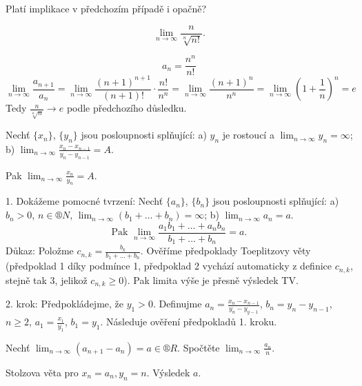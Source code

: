 \documentclass[12pt]{article}					%
\begin{document}
    \begin{priklad}
        Platí implikace v předchozím případě i opačně?
    \end{priklad}

    \begin{priklad}
        $$ \lim_{n \rightarrow ∞} \frac{n}{\sqrt[n]{n!}}. $$ 
        \begin{reseni}
            $$ a_n = \frac{n^n}{n!} $$ 
            $$ \lim_{n \rightarrow ∞} \frac{a_{n+1}}{a_n} = \lim_{n \rightarrow ∞} \frac{(n+1)^{n+1}}{(n+1)!} · \frac{n!}{n^n} = \lim_{n \rightarrow ∞} \frac{(n+1)^n}{n^n} = \lim_{n \rightarrow ∞}(1+\frac{1}{n})^n = e $$
            Tedy $\frac{n}{\sqrt[n]{n}} \rightarrow e$ podle předchozího důsledku.
        \end{reseni}
    \end{priklad}


    \begin{veta}[Stolzova]
        Nechť $\{x_n\}$, $\{y_n\}$ jsou posloupnosti splňující: a) $y_n$ je rostoucí a $\lim_{n \rightarrow ∞} y_n = ∞$; b) $\lim_{n \rightarrow ∞} \frac{x_n - x_{n-1}}{y_n - y_{n-1}} = A$.

        Pak $\lim_{n \rightarrow ∞} \frac{x_n}{y_n} = A$.

        \begin{dukazin}
            1. Dokážeme pomocné tvrzení: Nechť $\{a_n\}$, $\{b_n\}$ jsou posloupnosti splňující: a) $b_n > 0$, $n \in ®N$, $\lim_{n \rightarrow ∞} (b_1 + … + b_n) = ∞$; b) $\lim_{n \rightarrow ∞} a_n = a$.
            $$ \text{Pak } \lim_{n \rightarrow ∞} \frac{a_1b_1 + … + a_nb_n}{b_1 + … + b_n} = a. $$
            Důkaz: Položme $c_{n, k} = \frac{b_k}{b_1 + … + b_n}$. Ověříme předpoklady Toeplitzovy věty (předpoklad 1 díky podmínce 1, předpoklad 2 vychází automaticky z definice $c_{n, k}$, stejně tak 3, jelikož $c_{n,k} ≥ 0$). Pak limita výše je přesně výsledek TV.

            2. krok: Předpokládejme, že $y_1 > 0$. Definujme $a_n = \frac{x_n - x_{n-1}}{y_n - y_{y-1}}$, $b_n = y_n - y_{n-1}$, $n≥2$, $a_1 = \frac{x_1}{y_1}$, $b_1 = y_1$. Následuje ověření předpokladů 1. kroku.
        \end{dukazin}
    \end{veta}

    \begin{priklad}
        Nechť $\lim_{n \rightarrow ∞}(a_{n+1} - a_n) = a \in ®R$. Spočtěte $\lim_{n \rightarrow ∞} \frac{a_n}{n}$.
        \begin{reseni}
            Stolzova věta pro $x_n = a_n, y_n = n$. Výsledek $a$.
        \end{reseni}
    \end{priklad}
\end{document}
